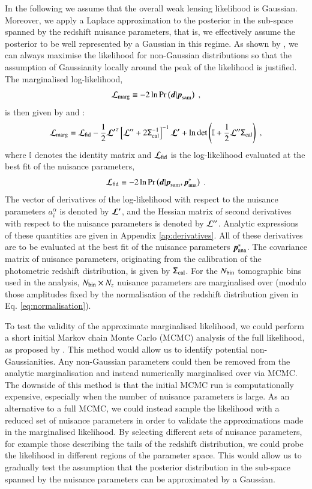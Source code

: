 \documentclass{aa}
\newcommand{\eq}[1]{\begin{equation}  #1 \end{equation}}
\newcommand{\br}[1]{\left( #1 \right)}
\newcommand{\bb}[1]{\left[ #1 \right]}
\newcommand{\pr}{{\rm Pr}}
\begin{document}
In the following we assume that the overall weak lensing likelihood is Gaussian. Moreover, we apply a Laplace approximation to the posterior in the sub-space spanned by the redshift nuisance parameters, that is, we effectively assume the posterior to be well represented by a Gaussian in this regime. As shown by \cite{taylor10}, we can always maximise the likelihood for non-Gaussian distributions so that the assumption of Gaussianity locally around the peak of the likelihood is justified. The marginalised log-likelihood,
\eq{
{\cal L}_{\rm marg}  \equiv -2 \ln \pr \br{\boldsymbol{d} | \boldsymbol{p}_{\rm sam}}\;,
}
is then given by \citet{bridle02} and \citet{taylor10}:
\eq{
\label{eq:marginal_likelihood}
{\cal L}_{\rm marg} = {\cal L}_{\rm fid} - \frac{1}{2} \boldsymbol{\cal L^\prime}^\tau  \bb{ {\cal L^{\prime\prime}} + 2 \tens{\Sigma}^{-1}_{\rm cal} }^{-1} \boldsymbol{\cal L^\prime} + \ln \det \br{ \mathbb{I} + \frac{1}{2} {\cal L^{\prime\prime}} \tens{\Sigma}_{\rm cal}}\;,
}
where $\mathbb{I}$ denotes the identity matrix and ${\cal L}_{\rm fid}$ is the log-likelihood evaluated at the best fit of the nuisance parameters,
\eq{
{\cal L}_{\rm fid} \equiv -2 \ln \pr \br{\boldsymbol{d} | \boldsymbol{p}_{\rm sam}, \boldsymbol{p}^*_{\rm ana}}\;.
}
The vector of derivatives of the log-likelihood with respect to the nuisance parameters $a_i^\alpha$ is denoted by $\boldsymbol{\cal L^\prime}$, and the Hessian matrix of second derivatives with respect to the nuisance parameters is denoted by ${\cal L^{\prime\prime}}$. Analytic expressions of these quantities are given in Appendix \ref{ap:derivatives}. All of these derivatives are to be evaluated at the best fit of the nuisance parameters $\boldsymbol{p}^*_{\rm ana}$. The covariance matrix of nuisance parameters, originating from the calibration of the photometric redshift distribution, is given by $\mathsf{\Sigma}_{\rm cal} $.
For the $N_{\rm bin}$ tomographic bins used in the analysis, $N_{\rm bin} \times N_z$ nuisance parameters are marginalised over (modulo those amplitudes fixed by the normalisation of the redshift distribution given in Eq. \eqref{eq:normalisation}).

To test the validity of the approximate marginalised likelihood, we could perform a short initial Markov chain Monte Carlo (MCMC) analysis of the full likelihood, as proposed by \cite{taylor10}. This method would allow us to identify potential non-Gaussianities. Any non-Gaussian parameters could then be removed from the analytic marginalisation and instead numerically marginalised over via MCMC. The downside of this method is that the initial MCMC run is computationally expensive, especially when the number of nuisance parameters is large. As an alternative to a full MCMC, we could instead sample the likelihood with a reduced set of nuisance parameters in order to validate the approximations made in the marginalised likelihood. By selecting different sets of nuisance parameters, for example those describing the tails of the redshift distribution, we could probe the likelihood in different regions of the parameter space. This would allow us to gradually test the assumption that the posterior distribution in the sub-space spanned by the nuisance parameters can be approximated by a Gaussian.
\end{document}
